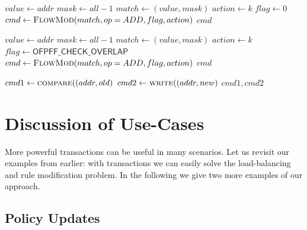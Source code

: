 \documentclass[conference]{sigcomm-alternate}
\newcommand{\concat}[0]{\oplus}
\newcommand{\cas}{CAS\xspace}
\newcommand{\compare}{compare\xspace}
\newcommand{\memwrite}{write\xspace}
\begin{document}
\begin{algorithm}[h]
    \caption{$\textit{write}(addr,k)$}
    \label{alg:write}
    \begin{algorithmic}[1]
    		\State $value \gets addr$
    		\State $mask \gets  all-1$
    		\State $match \gets (value,mask)$
    		\State $action \gets k$
    		\State $flag \gets 0$
    		\State $cmd\gets \textsc{FlowMod}(match, op = ADD, flag, action) $
			\Return $cmd$
    \end{algorithmic}
\end{algorithm}

\begin{algorithm}[h]
    \caption{$\textit{\compare}(addr,k)$}
    \label{alg:compare}
    \begin{algorithmic}[1]
    		\State $value \gets addr$
    		\State $mask \gets  all-1$
    		\State $match \gets (value,mask)$
    		\State $action \gets k$
    		\State $flag \gets \textsf{OFPFF\_CHECK\_OVERLAP}$
    		\State $cmd\gets \textsc{FlowMod}(match, op = ADD, flag, action) $
			\Return $cmd$
    \end{algorithmic}
\end{algorithm}



\begin{algorithm}[h]
    \caption{$\textit{\cas}(addr, old,new)$}
    \label{alg:cas}
    \begin{algorithmic}[1]

    		\State $cmd1\gets \textsc{\compare}((addr, old) $
    		\State $cmd2\gets \textsc{\memwrite}((addr, new) $
			\Return $cmd1,cmd2$
    \end{algorithmic}
\end{algorithm}



\section{Discussion of Use-Cases}\label{sec:apps}

More powerful transactions can be useful in many scenarios.
Let us revisit our examples from earlier: with
transactions we can easily solve the load-balancing
and rule modification problem.
In the following we give two more examples of our approach.

\subsection{Policy Updates}
\end{document}
